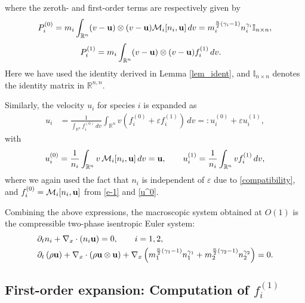 \documentclass[10pt,reqno]{amsart}
\numberwithin{equation}{section}
\begin{document}
where the zeroth- and first-order terms are respectively given by
\[
P_i^{(0)} = m_i \int_{\mathbb{R}^n} (v - {\bf{u}}) \otimes (v - {\bf{u}}) \mathcal{M}_i[n_i, {\bf{u}}]\,dv = m_i^{\frac{n}{2}(\gamma_i - 1)} n_i^{\gamma_i} \mathbb{I}_{n \times n},
\]
\begin{align*}
P_i^{(1)} &= m_i \int_{\mathbb{R}^n} (v - {\bf{u}}) \otimes (v - {\bf{u}}) f_i^{(1)}\,dv.
\end{align*}
Here we have used the identity derived in Lemma \ref{lem_ident}, and $\mathbb{I}_{n \times n}$ denotes the identity matrix in $\mathbb{R}^{n,n}$.

Similarly, the velocity $u_i$ for species $i$ is expanded as
\begin{align*}
u_i &= \frac{1}{\int_{\mathbb{R}^n} f_i^{(0)}\,dv} \int_{\mathbb{R}^n} v \left( f_i^{(0)} + \varepsilon f_i^{(1)} \right)\,dv   =: u_i^{(0)} + \varepsilon u_i^{(1)},
\end{align*}
with
\begin{equation}\label{u_01}
u_i^{(0)} = \frac{1}{n_i} \int_{\mathbb{R}^n} v \, \mathcal{M}_i[n_i, {\bf{u}}]\,dv = {\bf{u}}, \qquad u_i^{(1)} = \frac{1}{n_i} \int_{\mathbb{R}^n} v f_i^{(1)}\,dv,
\end{equation}
where we again used  the fact that $n_i$ is independent of $\varepsilon$ due to \eqref{compatibility}, and $f_i^{(0)} = \mathcal{M}_i[n_i, {\bf{u}}]$ from \eqref{e-1} and \eqref{u^0}.


Combining the above expressions, the macroscopic system obtained at $O(1)$ is the compressible two-phase isentropic Euler system:
\begin{align}\label{Euler system}
\begin{split}
	&\partial_t n_i + \nabla_x \cdot (n_i {\bf{u}}) = 0, \qquad i=1,2, \\
	&\partial_t \left( \rho {\bf{u}} \right) + \nabla_x \cdot \left( \rho {\bf{u}} \otimes {\bf{u}} \right) + \nabla_x \left( m_1^{\frac{n}{2}(\gamma_1 - 1)} n_1^{\gamma_1} + m_2^{\frac{n}{2}(\gamma_2 - 1)} n_2^{\gamma_2} \right) = 0.
\end{split}
\end{align}


\subsection{First-order expansion: Computation of $f_i^{(1)}$} 
\end{document}
